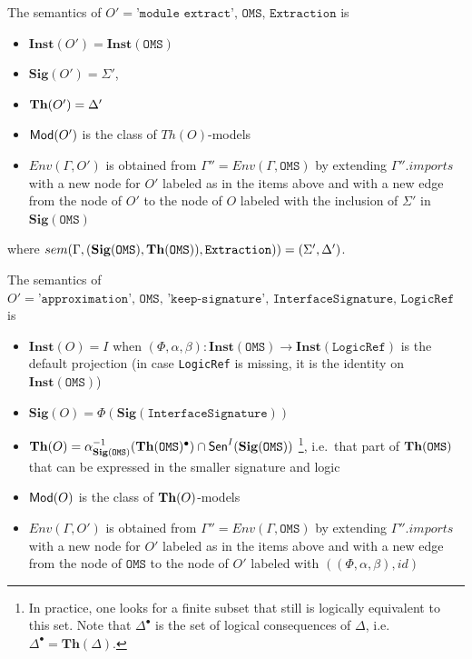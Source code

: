 \documentclass[10pt,fleqn,%
\ifpretendfinal
final%
\else
draft%
\fi,
]{scrreprt}
\newcommand*{\syntax}[1]{\texttt{#1}}
\newcommand{\Sig}{\mathbf{Sig}}
\newcommand{\Inst}{\ensuremath{\mathbf{Inst}}}
\begin{document}
The semantics of $O' = \syntax{'module extract', OMS, 
Extraction}$ is
\begin{itemize}
  \item $\Inst(O') = \Inst(\syntax{OMS})$
  \item $\Sig(O') = \Sigma'$,
     
  \item $\mathbf{Th}(O') = \Delta'$
  \item $\mathsf{Mod}(O')$ is the class of $Th(O)$-models
  \item $Env(\Gamma, O')$ is obtained from 
       $\Gamma'' = Env(\Gamma, \syntax{OMS})$
       by extending $\Gamma''.imports$
        with a new node for $O'$ labeled as in the items above
        and with a new edge from the node of $O'$ to the node of $O$ labeled with
        the inclusion of $\Sigma'$ in $\Sig(\syntax{OMS})$
\end{itemize}
where 
$sem(\Gamma, (\Sig(\syntax{OMS}), \Th(\syntax{OMS})), \syntax{Extraction})) = 
(\Sigma',\Delta')$.

The semantics of $O' = \syntax{'approximation', OMS, 
'keep-signature', InterfaceSignature, LogicRef }$ is
\begin{itemize}
  \item $\Inst(O) = I$ when $(\Phi,\alpha,\beta) : \Inst(\syntax{OMS}) \to \Inst(\syntax{LogicRef})$ is the default projection (in case \syntax{LogicRef} is missing, it is the identity on $\Inst(\syntax{OMS})$)
  \item $\Sig(O) =
   \Phi(\Sig(\syntax{InterfaceSignature}))$
  \item $\Th(O) = \alpha^{-1}_{\Sig(\syntax{OMS})}(\Th(\syntax{OMS})^\bullet)\cap\Sen^I(\Sig(\syntax{OMS}))$
  \footnote{In practice, one looks for a finite subset that still is logically equivalent to this set. Note that $\Delta^\bullet$ is the set of logical consequences of $\Delta$, i.e.\ $\Delta^\bullet = \mathbf{Th}(\Delta)$.}, i.e.\ that part of $\Th(\syntax{OMS})$ that can be expressed in the smaller signature and logic 
  \item $\mathsf{Mod}(O)$ is the class of $\mathbf{Th}(O)$-models
  \item $Env(\Gamma, O')$ is obtained from 
       $\Gamma'' = Env(\Gamma, \syntax{OMS})$
       by extending $\Gamma''.imports$
        with a new node for $O'$ labeled as in the items above
        and with a new edge from the node of $\syntax{OMS}$ to the node of $O'$ 
        labeled with $((\Phi,\alpha,\beta),id)$ 

\end{itemize}
\end{document}
